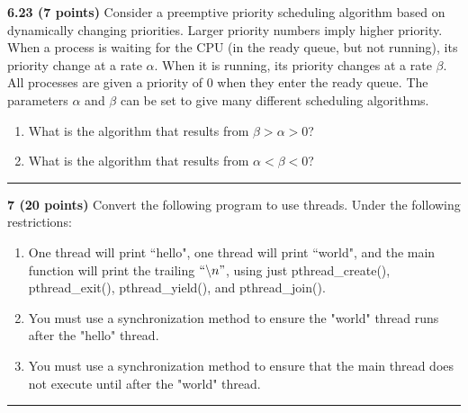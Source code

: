 \documentclass[12pt]{jhwhw}
\begin{document}
\textbf{6.23 (7 points)} 
	Consider a preemptive priority scheduling algorithm based on dynamically
	changing priorities. Larger priority numbers imply higher priority.
	When a process is waiting for the CPU (in the ready queue, but not
	running), its priority change at a rate $\alpha$. When it is running, its
	priority changes at a rate $\beta$. All processes are given a priority of 0 when they
	enter the ready queue. The parameters $\alpha$ and $\beta$ can be set to give 
	many different scheduling algorithms.
	\begin{enumerate}
		\item What is the algorithm that results from $\beta > \alpha > 0$?
		\item What is the algorithm that results from $\alpha < \beta < 0$?
	\end{enumerate}
\textcolor[RGB]{240,240,240}{\rule{\textwidth}{0.5pt}}\bigbreak

	\begin{addmargin}[1em]{}
	\end{addmargin}

\textbf{7 (20 points)} Convert the following program to use threads.
	Under the following restrictions:
	\begin{enumerate}
		\item One thread will print ``hello", one thread will print ``world", and the
			main function will print the trailing $``\backslash n"$, using just
			pthread_create(), pthread_exit(), pthread_yield(), and
			pthread_join().
		\item You must use a synchronization method to ensure the "world" thread
			runs after the "hello" thread.
		\item You must use a synchronization method to ensure that the main
			thread does not execute until after the "world" thread.
	\end{enumerate}

\textcolor[RGB]{240,240,240}{\rule{\textwidth}{0.5pt}}\bigbreak
\inputminted{c}{7.c}
\end{document}

